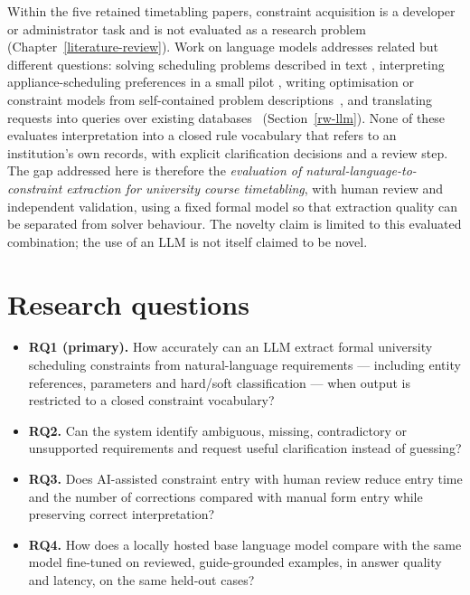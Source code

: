Within the five retained timetabling papers, constraint acquisition is a developer or
administrator task and is not evaluated as a research problem (Chapter~\ref{literature-review}). Work on language models addresses related but different questions: solving scheduling problems described in text
\cite{sharma2026schedbench}, interpreting appliance-scheduling preferences in a small pilot
\cite{sanguinetti2025preferences}, writing optimisation or constraint models from self-contained problem descriptions~\cite{ramamonjison2023nl4opt,michailidis2025cpbench}, and translating requests into queries over existing databases~\cite{li2023bird} (Section~\ref{rw-llm}). None of these evaluates interpretation into a closed rule vocabulary that refers to an institution's own records, with explicit clarification decisions and a review step. The
gap addressed here is therefore the \emph{evaluation of
natural-language-to-constraint extraction for university course
timetabling}, with human review and independent validation, using a
fixed formal model so that extraction quality can be separated from
solver behaviour. The novelty claim is limited to this evaluated
combination; the use of an LLM is not itself claimed to be novel.

\hypertarget{research-questions}{%
\section{Research questions}\label{research-questions}}

\begin{itemize}
\tightlist
\item
  \textbf{RQ1 (primary).} How accurately can an LLM extract formal
  university scheduling constraints from natural-language requirements
  --- including entity references, parameters and hard/soft
  classification --- when output is restricted to a closed constraint
  vocabulary?
\item
  \textbf{RQ2.} Can the system identify ambiguous, missing,
  contradictory or unsupported requirements and request useful
  clarification instead of guessing?
\item
  \textbf{RQ3.} Does AI-assisted constraint entry with human review
  reduce entry time and the number of corrections compared with manual
  form entry while preserving correct interpretation?
\item
  \textbf{RQ4.} How does a locally hosted base language model compare
  with the same model fine-tuned on reviewed, guide-grounded examples,
  in answer quality and latency, on the same held-out cases?
\end{itemize}

